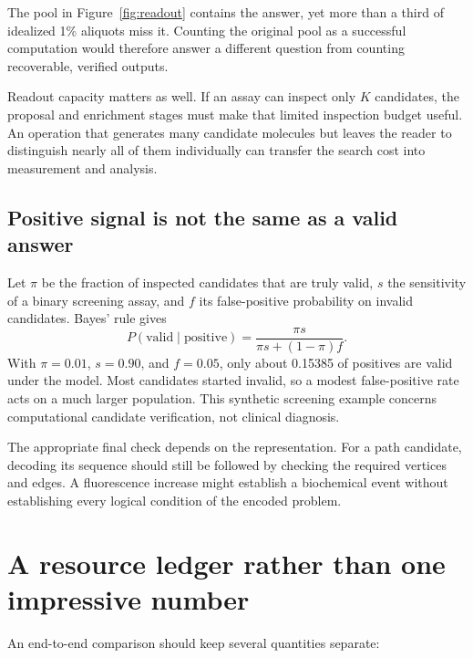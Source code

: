 The pool in Figure~\ref{fig:readout} contains the answer, yet more than a third of idealized 1\% aliquots miss it. Counting the original pool as a successful computation would therefore answer a different question from counting recoverable, verified outputs.

Readout capacity matters as well. If an assay can inspect only $K$ candidates, the proposal and enrichment stages must make that limited inspection budget useful. An operation that generates many candidate molecules but leaves the reader to distinguish nearly all of them individually can transfer the search cost into measurement and analysis.

\subsection{Positive signal is not the same as a valid answer}

Let $\pi$ be the fraction of inspected candidates that are truly valid, $s$ the sensitivity of a binary screening assay, and $f$ its false-positive probability on invalid candidates. Bayes' rule gives
\begin{equation}
P(\mathrm{valid}\mid\mathrm{positive})=
\frac{\pi s}{\pi s+(1-\pi)f}. \label{eq:ppv}
\end{equation}
With $\pi=0.01$, $s=0.90$, and $f=0.05$, only about 0.15385 of positives are valid under the model. Most candidates started invalid, so a modest false-positive rate acts on a much larger population. This synthetic screening example concerns computational candidate verification, not clinical diagnosis.

The appropriate final check depends on the representation. For a path candidate, decoding its sequence should still be followed by checking the required vertices and edges. A fluorescence increase might establish a biochemical event without establishing every logical condition of the encoded problem.

\section{A resource ledger rather than one impressive number}

An end-to-end comparison should keep several quantities separate:

